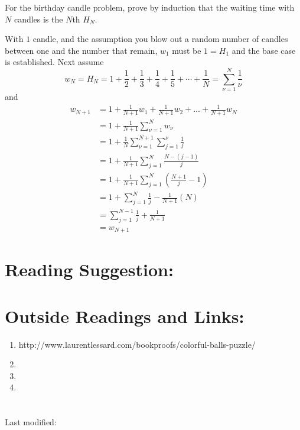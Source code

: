 \documentclass[12pt]{article}
\begin{document}
\begin{exercise}
    For the birthday candle problem, prove by induction that the waiting
    time with \( N \) candles is the \( N \)th  \(
    H_N \).
\end{exercise}
\begin{solution}
    With \( 1 \) candle, and the assumption you blow out a random number
    of candles between one and the number that remain, \( w_1 \) must be
    \( 1 = H_1 \) and the base case is established.  Next assume
    \[
        w_N = H_N = 1 + \frac{1}{2} + \frac{1}{3} + \frac{1}{4} + \frac{1}
        {5} + \cdots + \frac{1}{N} = \sum\limits_{\nu=1}^{N} \frac{1}{\nu}
    \] and
    \begin{align*}
        w_{N+1} &= 1 + \frac{1}{N+1} w_1 + \frac{1}{N+1} w_2 + \dots +
        \frac{1}{N+1} w_N \\
        &= 1 + \frac{1}{N+1} \sum\limits_{\nu=1}^{N} w_{\nu} \\
        &= 1 + \frac{1}{N} \sum\limits_{\nu=1}^{N+1} \sum\limits_{j=1}^\nu
        \frac{1}{j} \\
        &= 1 + \frac{1}{N+1} \sum\limits_{j=1}^{N} \frac{N-(j-1)}{j} \\
        &= 1 + \frac{1}{N+1} \sum\limits_{j=1}^{N} \left( \frac{N+1}
        {j} - 1 \right) \\
        &= 1 + \sum\limits_{j=1}^{N} \frac{1}{j} -\frac{1}{N+1} (N) \\
        &= \sum\limits_{j=1}^{N-1} \frac{1}{j} + \frac{1}{N+1} \\
        &= w_{N+1}
    \end{align*}
\end{solution}
\hr

\section*{Reading Suggestion:}




\hr

\section*{Outside Readings and Links:}
\begin{enumerate}
    \item
        http://www.laurentlessard.com/bookproofs/colorful-balls-puzzle/
    \item
    \item
    \item
\end{enumerate}

\hr

\section*{\solutionsname} \loadSolutions


\mydisclaim \myfooter

Last modified:  \flastmod
\end{document}
